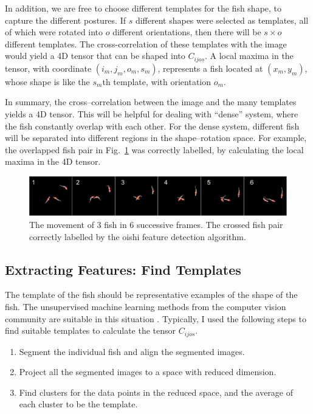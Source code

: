 \documentclass[11pt,twoside]{report}
\begin{document}
In addition, we are free to choose different templates for the fish shape, to capture the different postures. If $s$ different shapes were selected as templates, all of which were rotated into $o$ different orientations, then there will be $s \times o$ different templates. The cross-correlation of these templates with the image would yield a 4D tensor that can be shaped into $C_{ijos}$. A local maxima in the tensor, with coordinate $(i_m, j_m, o_m, s_m)$, represents a fish located at $(x_m, y_m)$, whose shape is like the $s_m$th template, with orientation $o_m$.


In summary, the cross--correlation between the image and the many templates yields a 4D tensor. This will be helpful for dealing with ``dense'' system, where the fish constantly overlap with each other. For the dense system, different fish will be separated into different regions in the shape--rotation space. For example, the overlapped fish pair in Fig.\ \ref{fig:fish_cross} was correctly labelled, by calculating the local maxima in the 4D tensor.


\begin{figure}
  \includegraphics[width=\linewidth,outer]{cross-resolve}
  \caption{The movement of 3 fish in 6 successive frames. The crossed fish pair correctly labelled by the oishi feature detection algorithm.}
  \label{fig:fish_cross}
\end{figure}


\subsection{Extracting Features: Find Templates}
\label{section:oishi_template}

The template of the fish should be representative examples of the shape of the fish. The unsupervised machine learning methods from the computer vision community are suitable in this situation \cite{goodfellow2016}. Typically, I used the following steps to find suitable templates to calculate the tensor $C_{ijos}$.

\begin{enumerate}
	\item Segment the individual fish and align the segmented images.
	\item Project all the segmented images to a space with reduced dimension.
	\item Find clusters for the data points in the reduced space, and the average of each cluster to be the template.
\end{enumerate}
\end{document}
